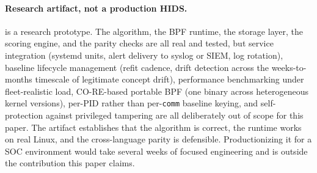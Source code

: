 \paragraph{Research artifact, not a production HIDS.}
\chronosynd{} is a research prototype. The algorithm, the BPF
runtime, the storage layer, the scoring engine, and the parity
checks are all real and tested, but service integration (systemd
units, alert delivery to syslog or SIEM, log rotation), baseline
lifecycle management (refit cadence, drift detection across the
weeks-to-months timescale of legitimate concept drift), performance
benchmarking under fleet-realistic load, CO-RE-based portable BPF
(one binary across heterogeneous kernel versions), per-PID rather
than per-\texttt{comm} baseline keying, and self-protection against
privileged tampering are all deliberately out of scope for this
paper. The artifact establishes that the algorithm is correct, the
runtime works on real Linux, and the cross-language parity is
defensible. Productionizing it for a SOC environment would take
several weeks of focused engineering and is outside the contribution
this paper claims.
